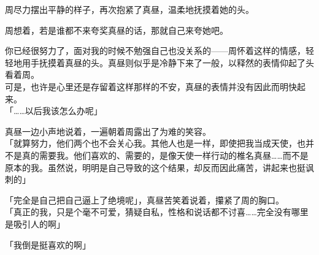 周尽力摆出平静的样子，再次抱紧了真昼，温柔地抚摸着她的头。

周想着，若是谁都不来夸奖真昼的话，那就自己来夸她吧。

你已经很努力了，面对我的时候不勉强自己也没关系的——周怀着这样的情感，轻轻地用手抚摸着真昼的头。真昼则似乎是冷静下来了一般，以释然的表情仰起了头看着周。\\

可是，也许是心里还是存留着这样那样的不安，真昼的表情并没有因此而明快起来。\\

「……以后我该怎么办呢」

真昼一边小声地说着，一遍朝着周露出了为难的笑容。\\

「就算努力，他们两个也不会关心我。其他人也是一样，即使把我当成天使，也并不是真的需要我。他们喜欢的、需要的，是像天使一样行动的椎名真昼……而不是原本的我。虽然说，明明是自己导致的这个结果，却反而因此痛苦，讲起来也挺讽刺的」

「完全是自己把自己逼上了绝境呢」，真昼苦笑着说着，攥紧了周的胸口。\\

「真正的我，只是个毫不可爱，猜疑自私，性格和说话都不讨喜……完全没有哪里是吸引人的啊」

「我倒是挺喜欢的啊」\\

